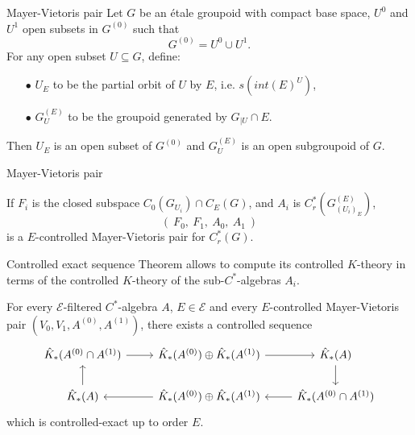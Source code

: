 \begin{frame}{Mayer-Vietoris pair}
Let $G$ be an \'etale groupoid with compact base space, $U^0$ and $U^1$ open subsets in $G^{(0)}$ such that
\[G^{(0)} = U^0 \cup U^1. \]
For any open subset $U\subseteq G$, define:
\begin{itemize}
\item[$\bullet$] $U_E$ to be the partial orbit of $U$ by $E$, i.e. $s(int(E)^U)$, 
\item[$\bullet$] $G^{(E)}_U$ to be the groupoid generated by $G_{|U}\cap E$.
\end{itemize} 
Then $U_E$ is an open subset of $G^{(0)}$ and $G^{(E)}_U$ is an open subgroupoid of $G$.\\
\end{frame}

\begin{frame}{Mayer-Vietoris pair}
\begin{propfr} 
If $F_i$ is the closed subspace $C_0(G_{U_i})\cap C_E(G)$, and $A_i$ is $C_r^*(G_{(U_i)_E}^{(E)})$, 
\[\left( \ F_0 , \ F_1 ,\ A_0 , \ A_1  \  \right)\]
is a $E$-controlled Mayer-Vietoris pair for $C_r^*(G)$. 
\end{propfr}
\end{frame}
\begin{frame}{Controlled exact sequence}
Theorem  allows to compute its controlled $K$-theory in terms of the controlled $K$-theory of the sub-$C^*$-algebras $A_i$. 

\begin{thmfr}[$3.10$ of \cite{OY4}]
For every $\mathcal E$-filtered $C^*$-algebra $A$, $E\in \mathcal E$ and every $E$-controlled Mayer-Vietoris pair $(V_0, V_1, A^{(0)}, A^{(1)})$, there exists a controlled sequence
\[\begin{tikzcd}[ampersand replacement=\&]
 \hat K_*( A^{(0)}\cap A^{(1)} ) \arrow{r} \& \hat K_*(A^{(0)}) \oplus \hat K_*(A^{(1)}) \arrow{r} \& \hat K_*(A) \arrow{d} \\ 
\hat K_*(A) \arrow{u} \& \hat K_*(A^{(0)}) \oplus \hat K_*(A^{(1)}) \arrow{l} \& \hat K_*( A^{(0)}\cap A^{(1)} ) \arrow{l}
\end{tikzcd}\] 
which is controlled-exact up to order $E$.  
\end{thmfr}  
\end{frame}


